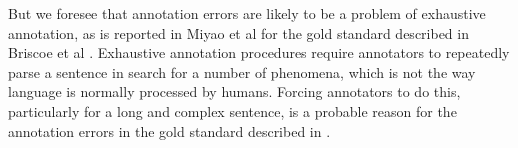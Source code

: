 \documentclass[11pt]{article}
\begin{document}
%
But we foresee that annotation errors are likely to be a problem of exhaustive annotation, as is reported in Miyao et al  for the gold standard described in Briscoe et al . Exhaustive annotation procedures require annotators to repeatedly parse a sentence in search for a number of phenomena, which is not the way language is normally processed by humans. Forcing annotators to do this, particularly for a long and complex sentence, is a probable reason for the annotation errors in the gold standard described in \cite{briscodandcarrollandwatson2006}.
\end{document}
